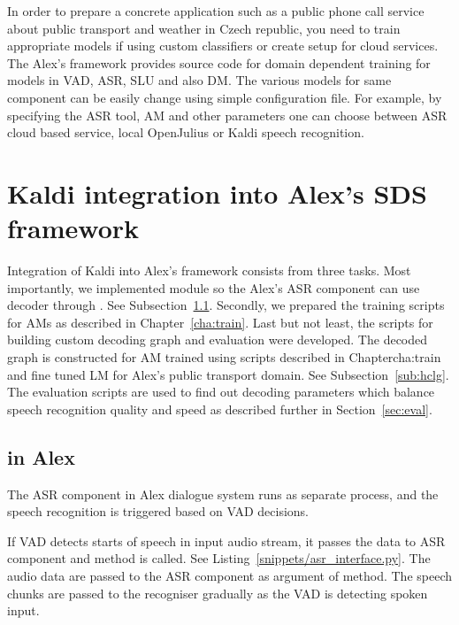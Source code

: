In order to prepare a concrete application such as a public phone call service about public transport and weather in Czech republic, you need to train appropriate models if using custom classifiers or create setup for cloud services.
The Alex's framework provides source code for domain dependent training for models in \ac{VAD}, \ac{ASR}, \ac{SLU} and also \ac{DM}.
The various models for same component can be easily change using simple configuration file. 
For example, by specifying the \ac{ASR} tool, \ac{AM} and other parameters one can choose between \ac{ASR} cloud based service, local OpenJulius or Kaldi speech recognition.



\section[Kaldi integration into \ac{SDS} framework]{Kaldi integration into Alex's \acl{SDS} framework}
\label{sec:asrsds}

Integration of Kaldi into Alex's framework consists from three tasks.
Most importantly, we implemented  module so the Alex's \ac{ASR} component can use  decoder through .
See Subsection~\ref{sub:asr_component}.
Secondly, we prepared the training scripts for \acp{AM} as described in Chapter~\ref{cha:train}.
Last but not least, the scripts for building custom decoding graph  and evaluation were developed.
The decoded graph  is constructed for \ac{AM} trained using scripts described in Chapter{cha:train} and fine tuned \ac{LM} for Alex's public transport domain.
See Subsection~\ref{sub:hclg}.
The evaluation scripts are used to find out decoding parameters which balance speech recognition quality and speed as described further in Section~\ref{sec:eval}.

\subsection{ in Alex}
\label{sub:asr_component}
The \ac{ASR} component in Alex dialogue system runs as separate process, and the speech recognition is triggered based on \ac{VAD} decisions.

If \ac{VAD} detects starts of speech in input audio stream, it passes the data to \ac{ASR} component
and  method is called. See Listing~\ref{snippets/asr_interface.py}.
The audio data are passed to the ASR component as argument of  method.
The speech chunks are passed to the recogniser gradually as the \ac{VAD} is detecting spoken input.

